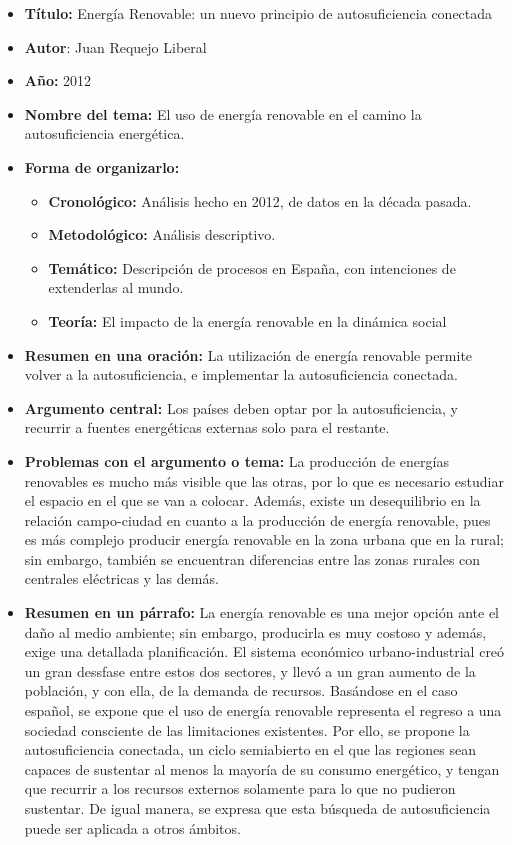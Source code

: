 \documentclass[
  letterpaper,
  DIV=11,
  numbers=noendperiod]{scrreprt}
\providecommand{\tightlist}{%
  \setlength{\itemsep}{0pt}\setlength{\parskip}{0pt}}\usepackage{longtable,booktabs,array}
\begin{document}
\begin{itemize}
\tightlist
\item
  \textbf{Título:} Energía Renovable: un nuevo principio de
  autosuficiencia conectada
\item
  \textbf{Autor}: Juan Requejo Liberal
\item
  \textbf{Año:} 2012
\item
  \textbf{Nombre del tema:} El uso de energía renovable en el camino la
  autosuficiencia energética.
\item
  \textbf{Forma de organizarlo:}

  \begin{itemize}
  \tightlist
  \item
    \textbf{Cronológico:} Análisis hecho en 2012, de datos en la década
    pasada.
  \item
    \textbf{Metodológico:} Análisis descriptivo.
  \item
    \textbf{Temático:} Descripción de procesos en España, con
    intenciones de extenderlas al mundo.
  \item
    \textbf{Teoría:} El impacto de la energía renovable en la dinámica
    social
  \end{itemize}
\item
  \textbf{Resumen en una oración:} La utilización de energía renovable
  permite volver a la autosuficiencia, e implementar la autosuficiencia
  conectada.
\item
  \textbf{Argumento central:} Los países deben optar por la
  autosuficiencia, y recurrir a fuentes energéticas externas solo para
  el restante.
\item
  \textbf{Problemas con el argumento o tema:} La producción de energías
  renovables es mucho más visible que las otras, por lo que es necesario
  estudiar el espacio en el que se van a colocar. Además, existe un
  desequilibrio en la relación campo-ciudad en cuanto a la producción de
  energía renovable, pues es más complejo producir energía renovable en
  la zona urbana que en la rural; sin embargo, también se encuentran
  diferencias entre las zonas rurales con centrales eléctricas y las
  demás.
\item
  \textbf{Resumen en un párrafo:} La energía renovable es una mejor
  opción ante el daño al medio ambiente; sin embargo, producirla es muy
  costoso y además, exige una detallada planificación. El sistema
  económico urbano-industrial creó un gran dessfase entre estos dos
  sectores, y llevó a un gran aumento de la población, y con ella, de la
  demanda de recursos. Basándose en el caso español, se expone que el
  uso de energía renovable representa el regreso a una sociedad
  consciente de las limitaciones existentes. Por ello, se propone la
  autosuficiencia conectada, un ciclo semiabierto en el que las regiones
  sean capaces de sustentar al menos la mayoría de su consumo
  energético, y tengan que recurrir a los recursos externos solamente
  para lo que no pudieron sustentar. De igual manera, se expresa que
  esta búsqueda de autosuficiencia puede ser aplicada a otros ámbitos.
\end{itemize}
\end{document}
